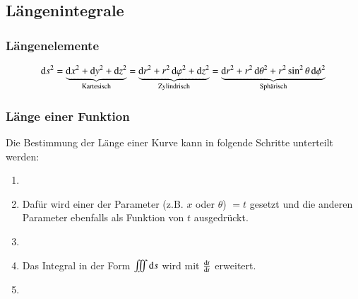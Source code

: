 \subsection{Längenintegrale}
\subsubsection{Längenelemente}\label{section:int_multivar:längenelemente}
$$
 \diff s^2 
    = \underbrace{\diff x^2 + \diff y^2 + \diff z^2}_{\text{Kartesisch}}
    = \underbrace{\diff r^2 + r^2 \diff \varphi^2 + \diff z^2}_{\text{Zylindrisch}}
    = \underbrace{\diff r^2 + r^2 \diff \theta^2 + r^2 \sin^2 \theta \diff \phi^2}_{\text{Sphärisch}}
$$
\subsubsection{Länge einer Funktion}
Die Bestimmung der Länge einer Kurve kann in folgende Schritte unterteilt werden:
\begin{enumerate}
    \item {}
    \item[] Dafür wird einer der Parameter (z.B. $x$ oder $\theta$) $=t$ gesetzt und die anderen Parameter ebenfalls als Funktion von $t$ ausgedrückt.
    \item {}
    \item[] Das Integral in der Form $ \iiint \mathop{} \! \mathrm{d} s $ wird mit $\frac{\mathop{} \! \mathrm{d} t}{\mathop{} \! \mathrm{d} t}$ erweitert.
    \item {}
\end{enumerate}

